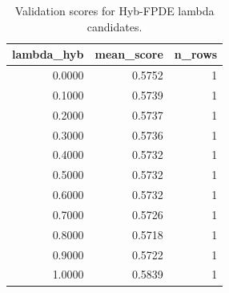 \begin{table}[t]
\caption{Validation scores for Hyb-FPDE lambda candidates.}
\label{tab:lambda_distribution_computed}
\centering
\begin{tabular}{rrr}
\toprule
lambda\_hyb & mean\_score & n\_rows \\
\midrule
0.0000 & 0.5752 & 1 \\
0.1000 & 0.5739 & 1 \\
0.2000 & 0.5737 & 1 \\
0.3000 & 0.5736 & 1 \\
0.4000 & 0.5732 & 1 \\
0.5000 & 0.5732 & 1 \\
0.6000 & 0.5732 & 1 \\
0.7000 & 0.5726 & 1 \\
0.8000 & 0.5718 & 1 \\
0.9000 & 0.5722 & 1 \\
1.0000 & 0.5839 & 1 \\
\bottomrule
\end{tabular}

\end{table}
